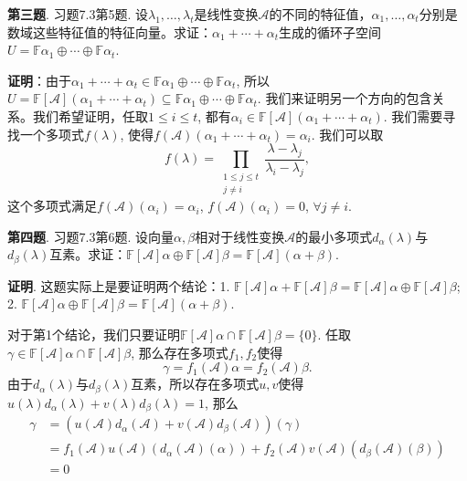 





\newpageorvspace


{\bf 第三题}. 习题7.3第5题. 设$\lambda_1, \ldots, \lambda_t$是线性变换$\mathscr{A}$的不同的特征值，$\alpha_1, \ldots, \alpha_t$分别是数域这些特征值的特征向量。求证：$\alpha_1 + \cdots + \alpha_t$生成的循环子空间$U = \mathbb{F}\alpha_1 \oplus \cdots \oplus \mathbb{F}\alpha_t$.

\newpageorvspace

{\bf 证明}：由于$\alpha_1 + \cdots + \alpha_t \in \mathbb{F}\alpha_1 \oplus \cdots \oplus \mathbb{F}\alpha_t$, 所以$U = \mathbb{F}[\mathscr{A}](\alpha_1 + \cdots + \alpha_t) \subseteq \mathbb{F}\alpha_1 \oplus \cdots \oplus \mathbb{F}\alpha_t$. 我们来证明另一个方向的包含关系。我们希望证明，任取$1 \leqslant i \leqslant t$, 都有$\alpha_i \in \mathbb{F}[\mathscr{A}](\alpha_1 + \cdots + \alpha_t)$. 我们需要寻找一个多项式$f(\lambda)$, 使得$f(\mathscr{A}) (\alpha_1 + \cdots + \alpha_t) = \alpha_i$. 我们可以取
$$f(\lambda) = \prod\limits_{\substack{1 \leqslant j \leqslant t \\ j \neq i}} \dfrac{\lambda - \lambda_j}{\lambda_i - \lambda_j},$$
这个多项式满足$f(\mathscr{A})(\alpha_i) = \alpha_i$, $f(\mathscr{A})(\alpha_i) = 0$, $\forall j \neq i$. 


\newpageorvspace


{\bf 第四题}. 习题7.3第6题. 设向量$\alpha, \beta$相对于线性变换$\mathscr{A}$的最小多项式$d_{\alpha}(\lambda)$与$d_{\beta}(\lambda)$互素。求证：$\mathbb{F}[\mathscr{A}]\alpha \oplus \mathbb{F}[\mathscr{A}]\beta = \mathbb{F}[\mathscr{A}](\alpha + \beta)$.

\newpageorvspace

{\bf 证明}. 这题实际上是要证明两个结论：1. $\mathbb{F}[\mathscr{A}]\alpha + \mathbb{F}[\mathscr{A}]\beta = \mathbb{F}[\mathscr{A}]\alpha \oplus \mathbb{F}[\mathscr{A}]\beta$; 2. $\mathbb{F}[\mathscr{A}]\alpha \oplus \mathbb{F}[\mathscr{A}]\beta = \mathbb{F}[\mathscr{A}](\alpha + \beta)$.

对于第1个结论，我们只要证明$\mathbb{F}[\mathscr{A}]\alpha \cap \mathbb{F}[\mathscr{A}]\beta = \{0\}$. 任取$\gamma \in \mathbb{F}[\mathscr{A}]\alpha \cap \mathbb{F}[\mathscr{A}]\beta$, 那么存在多项式$f_1, f_2$使得
$$\gamma = f_1(\mathscr{A})\alpha = f_2(\mathscr{A})\beta.$$
由于$d_{\alpha}(\lambda)$与$d_{\beta}(\lambda)$互素，所以存在多项式$u,v$使得$u(\lambda)d_{\alpha}(\lambda) + v(\lambda)d_{\beta}(\lambda) = 1$, 那么
\begin{align*}
\gamma & = (u(\mathscr{A})d_{\alpha}(\mathscr{A}) + v(\mathscr{A})d_{\beta}(\mathscr{A})) (\gamma) \\
& = f_1(\mathscr{A})u(\mathscr{A})(d_{\alpha}(\mathscr{A})(\alpha)) + f_2(\mathscr{A})v(\mathscr{A})(d_{\beta}(\mathscr{A})(\beta)) \\
& = 0
\end{align*}

